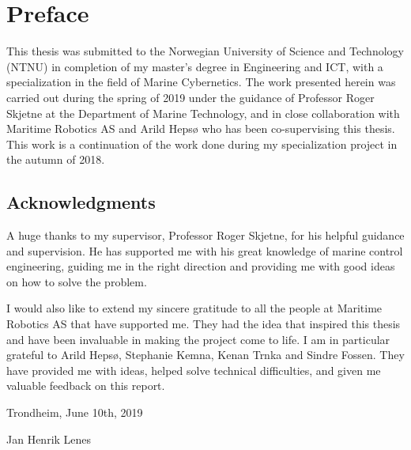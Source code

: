 \section*{Preface}
\thispagestyle{plain}

This thesis was submitted to the Norwegian University of Science and Technology (NTNU) in completion of my master's degree in Engineering and ICT, with a specialization in the field of Marine Cybernetics. The work presented herein was carried out during the spring of 2019 under the guidance of Professor Roger Skjetne at the Department of Marine Technology, and in close collaboration with Maritime Robotics AS and Arild Hepsø who has been co-supervising this thesis. This work is a continuation of the work done during my specialization project in the autumn of 2018.  

\subsection*{Acknowledgments}

A huge thanks to my supervisor, Professor Roger Skjetne, for his helpful guidance and supervision. He has supported me with his great knowledge of marine control engineering, guiding me in the right direction and providing me with good ideas on how to solve the problem.

I would also like to extend my sincere gratitude to all the people at Maritime Robotics AS that have supported me. They had the idea that inspired this thesis and have been invaluable in making the project come to life. I am in particular grateful to Arild Hepsø, Stephanie Kemna, Kenan Trnka and Sindre Fossen. They have provided me with ideas, helped solve technical difficulties, and given me valuable feedback on this report.

\vspace{1.5cm}

\centerline{Trondheim, June 10th, 2019}

\vspace{1cm}

\centerline{Jan Henrik Lenes}

\clearpage